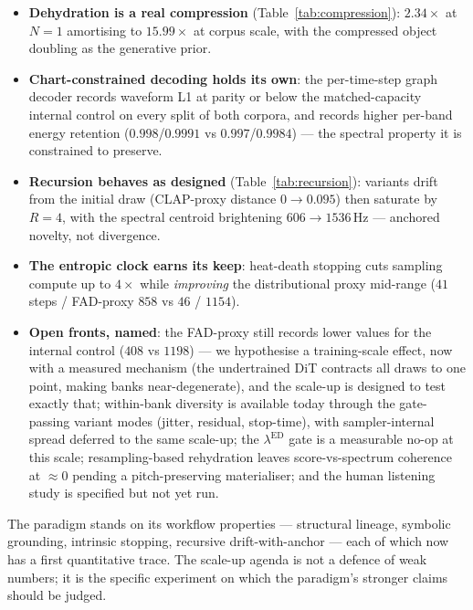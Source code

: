\documentclass[12pt,a4paper]{article}
\begin{document}
\begin{itemize}[leftmargin=*]
  \item \textbf{Dehydration is a real compression}
    (Table~\ref{tab:compression}): $2.34\times$ at $N{=}1$ amortising
    to $15.99\times$ at corpus scale, with the compressed object
    doubling as the generative prior.
  \item \textbf{Chart-constrained decoding holds its own}: the
    per-time-step graph decoder records waveform L1 at parity or below
    the matched-capacity internal control on every split of both
    corpora, and records higher per-band energy retention
    ($0.998$/$0.9991$ vs $0.997$/$0.9984$)
    — the spectral property it is constrained to preserve.
  \item \textbf{Recursion behaves as designed}
    (Table~\ref{tab:recursion}): variants drift from the initial draw
    (CLAP-proxy distance $0 \to 0.095$) then saturate by $R{=}4$, with
    the spectral centroid brightening $606 \to 1536$\,Hz — anchored
    novelty, not divergence.
  \item \textbf{The entropic clock earns its keep}: heat-death
    stopping cuts sampling compute up to $4\times$ while
    \emph{improving} the distributional proxy mid-range
    ($41$ steps / FAD-proxy $858$ vs $46$ / $1154$).
  \item \textbf{Open fronts, named}: the FAD-proxy still records lower
    values for the internal control ($408$ vs $1198$) — we hypothesise
    a training-scale effect, now with a measured mechanism (the
    undertrained DiT contracts all draws to one point, making banks
    near-degenerate), and the scale-up is designed to test exactly
    that; within-bank diversity is available today through the
    gate-passing variant modes (jitter, residual, stop-time), with
    sampler-internal spread deferred to the same scale-up; the
    $\lambda^{\mathrm{ED}}$ gate is a measurable no-op at
    this scale;
    resampling-based rehydration leaves score-vs-spectrum coherence
    at $\approx 0$ pending a pitch-preserving materialiser; and the
    human listening study is specified but not yet run.
\end{itemize}

The paradigm stands on its workflow properties — structural lineage,
symbolic grounding, intrinsic stopping, recursive drift-with-anchor —
each of which now has a first quantitative trace. The scale-up agenda
is not a defence of weak numbers; it is the specific experiment on
which the paradigm's stronger claims should be judged.
\end{document}
